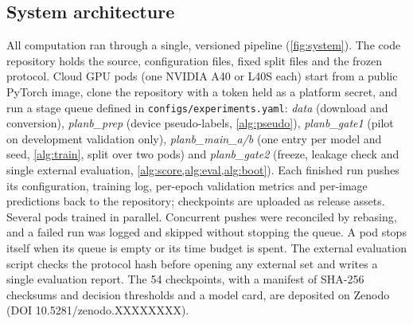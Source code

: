 \documentclass{ieeeaccess}
\newcommand{\zenodoDOI}{10.5281/zenodo.XXXXXXXX}%
\begin{document}
\subsection{System architecture}
\label{sec:system}
All computation ran through a single, versioned pipeline (\cref{fig:system}). The code repository holds the source, configuration files, fixed split files and the frozen protocol. Cloud GPU pods (one NVIDIA A40 or L40S each) start from a public PyTorch image, clone the repository with a token held as a platform secret, and run a stage queue defined in \texttt{configs/experiments.yaml}: \emph{data} (download and conversion), \emph{planb\_prep} (device pseudo-labels, \cref{alg:pseudo}), \emph{planb\_gate1} (pilot on development validation only), \emph{planb\_main\_a/b} (one entry per model and seed, \cref{alg:train}, split over two pods) and \emph{planb\_gate2} (freeze, leakage check and single external evaluation, \cref{alg:score,alg:eval,alg:boot}). Each finished run pushes its configuration, training log, per-epoch validation metrics and per-image predictions back to the repository; checkpoints are uploaded as release assets. Several pods trained in parallel. Concurrent pushes were reconciled by rebasing, and a failed run was logged and skipped without stopping the queue. A pod stops itself when its queue is empty or its time budget is spent. The external evaluation script checks the protocol hash before opening any external set and writes a single evaluation report. The 54 checkpoints, with a manifest of SHA-256 checksums and decision thresholds and a model card, are deposited on Zenodo (DOI \zenodoDOI).
\end{document}
